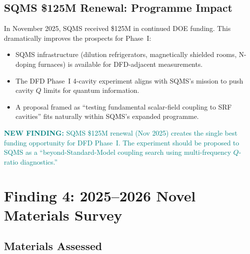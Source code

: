 \documentclass[11pt]{article}
\theoremstyle{definition}
\theoremstyle{remark}
\newcommand{\newfinding}[1]{\textcolor{teal}{\textbf{NEW FINDING:} #1}}
\begin{document}
\subsection{SQMS \$125M Renewal: Programme Impact}

In November 2025, SQMS received \$125M in continued DOE funding.
This dramatically improves the prospects for Phase~I:
\begin{itemize}[nosep]
\item SQMS infrastructure (dilution refrigerators, magnetically
  shielded rooms, N-doping furnaces) is available for DFD-adjacent
  measurements.
\item The DFD Phase~I 4-cavity experiment aligns with SQMS's mission
  to push cavity $Q$ limits for quantum information.
\item A proposal framed as ``testing fundamental scalar-field coupling
  to SRF cavities'' fits naturally within SQMS's expanded programme.
\end{itemize}

\newfinding{SQMS \$125M renewal (Nov 2025) creates the single best
funding opportunity for DFD Phase~I. The experiment should be
proposed to SQMS as a ``beyond-Standard-Model coupling search using
multi-frequency $Q$-ratio diagnostics.''}


\section{Finding 4: 2025--2026 Novel Materials Survey}
\label{sec:novel_materials}

\subsection{Materials Assessed}
\end{document}
